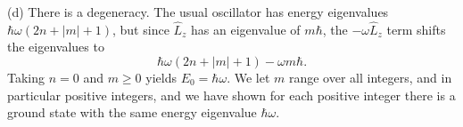\documentclass[11pt, letterpaper]{article}
\begin{document}
(d) There is a degeneracy. The usual oscillator has energy eigenvalues $\hbar \omega (2n+|m|+1)$, but since $\hat{L} _z$ has an eigenvalue of $m\hbar$, the $-\omega \hat{L} _z$ term shifts the eigenvalues to
\[
	\hbar \omega (2n+|m|+1) - \omega m\hbar
.\]
Taking $n=0$ and $m\geq 0$ yields $E_0 = \hbar \omega $. We let $m$ range over all integers, and in particular positive integers, and we have shown for each positive integer there is a ground state with the same energy eigenvalue $\hbar \omega $.
\end{document}
